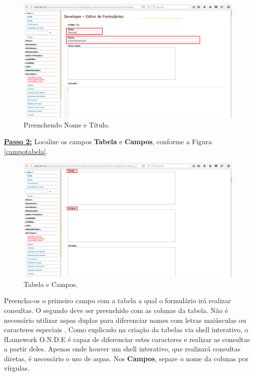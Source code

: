 \documentclass[9pt]{report}
\begin{document}
{      \begin{figure}[H]
       \includegraphics[width=\textwidth]{2_Formularios/2_Criacao_de_formularios/4.png}
       \caption{Preenchendo Nome e Título.}
       \label{fig:nometitulo}
      \end{figure}
      
      \underline{\textbf{Passo 2:}} Localize os campos
      \textbf{Tabela} e \textbf{Campos}, conforme a Figura
      \ref{campotabela}.
      
      \begin{figure}[H]
       \includegraphics[width=\textwidth]{2_Formularios/2_Criacao_de_formularios/5.png}
       \caption{Tabela e Campos.}
       \label{fig:campotabela}
      \end{figure}
      
      Preencha-os o primeiro campo com a tabela a qual o formulário
      irá realizar consultas. O segundo deve ser preenchido com as
      colunas da tabela. Não é necessário utilizar aspas duplas para
      diferenciar nomes com letras maiúsculas ou caracteres especiais
      .
      Como explicado na criação da tabelas via shell interativo, o
      fLamework O.N.D.E é capaz de diferenciar estes caracteres e
      realizar as consultas a partir deles. Apenas onde houver um
      shell interativo, que realizará consultas diretas, é necessário
      o uso de aspas. Nos \textbf{Campos}, separe o nome da colunas
      por vírgulas.

}
\end{document}
